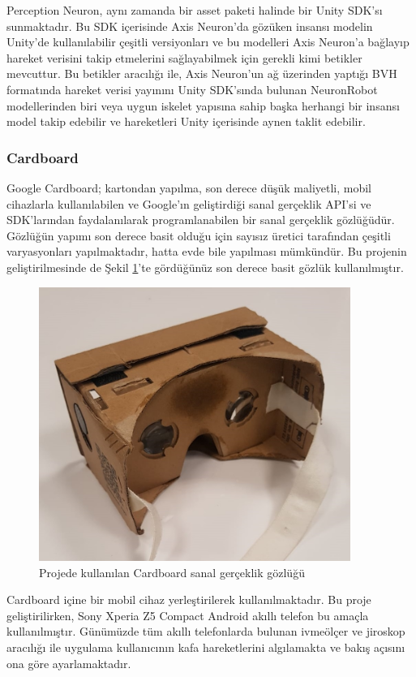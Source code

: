 \documentclass[a4paper, 12pt, titlepage]{article}
\begin{document}
Perception Neuron, aynı zamanda bir asset paketi halinde bir Unity SDK’sı sunmaktadır. Bu SDK
içerisinde Axis Neuron’da gözüken insansı modelin Unity’de kullanılabilir çeşitli versiyonları ve
bu modelleri Axis Neuron’a bağlayıp hareket verisini takip etmelerini sağlayabilmek için gerekli
kimi betikler mevcuttur. Bu betikler aracılığı ile, Axis Neuron’un ağ üzerinden yaptığı BVH
formatında hareket verisi yayınını Unity SDK’sında bulunan NeuronRobot modellerinden biri veya
uygun iskelet yapısına sahip başka herhangi bir insansı model takip edebilir ve hareketleri Unity
içerisinde aynen taklit edebilir.

\subsubsection{Cardboard}
Google Cardboard; kartondan yapılma, son derece düşük maliyetli, mobil cihazlarla kullanılabilen ve
Google’ın geliştirdiği sanal gerçeklik API’si ve SDK’larından faydalanılarak programlanabilen bir
sanal gerçeklik gözlüğüdür. Gözlüğün yapımı son derece basit olduğu için sayısız üretici tarafından
çeşitli varyasyonları yapılmaktadır, hatta evde bile yapılması mümkündür. Bu projenin
geliştirilmesinde de Şekil \ref{cbjpeg}’te gördüğünüz son derece basit gözlük kullanılmıştır.

\begin{figure}[ht!]
    \centering
        \includegraphics[width=4in]{images/cbjpeg}
    \caption{Projede kullanılan Cardboard sanal gerçeklik gözlüğü}   
    \label{cbjpeg}
\end{figure}

Cardboard içine bir mobil cihaz yerleştirilerek kullanılmaktadır. Bu proje geliştirilirken, Sony
Xperia Z5 Compact Android akıllı telefon bu amaçla kullanılmıştır. Günümüzde tüm akıllı
telefonlarda bulunan ivmeölçer ve jiroskop aracılığı ile uygulama kullanıcının kafa hareketlerini
algılamakta ve bakış açısını ona göre ayarlamaktadır.
\end{document}
